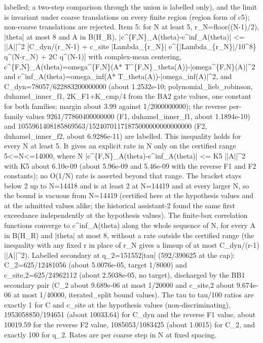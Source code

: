 \begin{gatequote}
labelled; a two-step comparison through the union is labelled only), and the
limit is invariant under coarse translations on every finite region (region
form of c5); non-coarse translations are rejected. Item 5: for N at least 5,
r\_N=floor((N-1)/2), |theta| at most 8 and A in B(H\_R),
|c\textasciicircum{}\{F,N\}\_A(theta)-c\textasciicircum{}inf\_A(theta)| <=
||A||\textasciicircum{}2 [C\_dyn/(r\_N-1) + c\textquotesingle{}\_site
|Lambda\_\{r\_N\}|
e\textasciicircum{}\{|Lambda\_\{r\_N\}|/10\textasciicircum{}8\}
q\textasciicircum{}(N-r\_N) + 2C\textquotesingle{} q\textasciicircum{}(N-1)]
with complex-mean centering,
c\textasciicircum{}\{F,N\}\_A(theta)=omega\textasciicircum{}\{F,N\}(A*
T\textasciicircum{}\{F,N\}\_theta(A))-|omega\textasciicircum{}\{F,N\}(A)|\textasciicircum{}2
and c\textasciicircum{}inf\_A(theta)=omega\_inf(A*
T\_theta(A))-|omega\_inf(A)|\textasciicircum{}2, and
C\_dyn=78057/622883200000000 (about 1.2532e-10; polynomial\_lieb\_robinson,
duhamel\_inner\_f1, 2K\_F1+K\_cmp/4 from the BA2 gate values, one constant for
both families; margin about 3.99 against 1/2000000000); the reverse per-family
values 9261/77860400000000 (F1, duhamel\_inner\_f1, about 1.1894e-10) and
1055961408185869563/15240701171875000000000000000 (F2, duhamel\_inner\_f2,
about 6.9286e-11) are labelled. This inequality holds for every N at least 5.
It gives an explicit rate in N only on the certified range 5<=N<=14000, where
N |c\textasciicircum{}\{F,N\}\_A(theta)-c\textasciicircum{}inf\_A(theta)| <=
K5 ||A||\textasciicircum{}2 with K5 about 6.10e-09 (about 5.96e-09 and
5.46e-09 with the reverse F1 and F2 constants); no O(1/N) rate is asserted
beyond that range. The bracket stays below 2 up to N=14418 and is at least 2
at N=14419 and at every larger N, so the bound is vacuous from N=14419
(certified here at the hypothesis values and at the admitted values alike; the
historical assistant-2 found the same first exceedance independently at the
hypothesis values). The finite-box correlation functions converge to
c\textasciicircum{}inf\_A(theta) along the whole sequence of N, for every A in
B(H\_R) and |theta| at most 8, without a rate outside the certified range (the
inequality with any fixed r in place of r\_N gives a limsup of at most
C\_dyn/(r-1) ||A||\textasciicircum{}2). Labelled secondary at q\_2=151552|tau|
(592/390625 at the cap): C\textquotesingle{}\_2=625/12481056 (about
5.0076e-05, target 1/8000) and c\textquotesingle{}\_site,2=625/24962112 (about
2.5038e-05, no target), discharged by the BB1 secondary pair (C\_2 about
9.689e-06 at most 1/20000 and c\_site,2 about 9.674e-06 at most 1/40000,
iterated\_split bound values). The tau to tau/100 ratios are exactly 1 for
C\textquotesingle{} and c\textquotesingle{}\_site at the hypothesis values
(non-discriminating), 1953058850/194651 (about 10033.64) for C\_dyn and the
reverse F1 value, about 10019.59 for the reverse F2 value, 1085053/1083425
(about 1.0015) for C\textquotesingle{}\_2, and exactly 100 for q\_2. Rates are
per coarse step in N at fixed spacing.
\end{gatequote}
